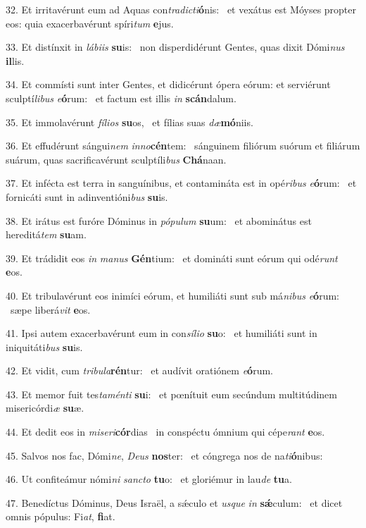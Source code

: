 32. Et irritavérunt eum ad Aquas con\textit{tra}\textit{dic}\textit{ti}\textbf{ó}nis: \ast\  et vexátus est Móyses propter eos: quia exacerbavérunt spíri\textit{tum} \textbf{e}jus.\

33. Et distínxit in \textit{lá}\textit{bi}\textit{is} \textbf{su}is: \ast\  non disperdidérunt Gentes, quas dixit Dómi\textit{nus} \textbf{il}lis.\

34. Et commísti sunt inter Gentes, et didicérunt ópera eórum: et serviérunt sculptí\textit{li}\textit{bus} \textit{e}\textbf{ó}rum: \ast\  et factum est illis \textit{in} \textbf{scán}dalum.\

35. Et immolavérunt \textit{fí}\textit{li}\textit{os} \textbf{su}os, \ast\  et fílias suas \textit{dæ}\textbf{mó}niis.\

36. Et effudérunt sángui\textit{nem} \textit{in}\textit{no}\textbf{cén}tem: \ast\  sánguinem filiórum suórum et filiárum suárum, quas sacrificavérunt sculptíli\textit{bus} \textbf{Chá}naan.\

37. Et infécta est terra in sanguínibus, et contamináta est in opé\textit{ri}\textit{bus} \textit{e}\textbf{ó}rum: \ast\  et fornicáti sunt in adinventióni\textit{bus} \textbf{su}is.\

38. Et irátus est furóre Dóminus in \textit{pó}\textit{pu}\textit{lum} \textbf{su}um: \ast\  et abominátus est hereditá\textit{tem} \textbf{su}am.\

39. Et trádidit eos \textit{in} \textit{ma}\textit{nus} \textbf{Gén}tium: \ast\  et domináti sunt eórum qui odé\textit{runt} \textbf{e}os.\

40. Et tribulavérunt eos inimíci eórum, et humiliáti sunt sub má\textit{ni}\textit{bus} \textit{e}\textbf{ó}rum: \ast\  sæpe liberá\textit{vit} \textbf{e}os.\

41. Ipsi autem exacerbavérunt eum in con\textit{sí}\textit{li}\textit{o} \textbf{su}o: \ast\  et humiliáti sunt in iniquitáti\textit{bus} \textbf{su}is.\

42. Et vidit, cum \textit{tri}\textit{bu}\textit{la}\textbf{rén}tur: \ast\  et audívit oratiónem \textit{e}\textbf{ó}rum.\

43. Et memor fuit tes\textit{ta}\textit{mén}\textit{ti} \textbf{su}i: \ast\  et pœnítuit eum secúndum multitúdinem misericórdi\textit{æ} \textbf{su}æ.\

44. Et dedit eos in \textit{mi}\textit{se}\textit{ri}\textbf{cór}dias \ast\  in conspéctu ómnium qui cépe\textit{rant} \textbf{e}os.\

45. Salvos nos fac, Dómi\textit{ne}, \textit{De}\textit{us} \textbf{nos}ter: \ast\  et cóngrega nos de na\textit{ti}\textbf{ó}nibus:\

46. Ut confiteámur nómi\textit{ni} \textit{sanc}\textit{to} \textbf{tu}o: \ast\  et gloriémur in lau\textit{de} \textbf{tu}a.\

47. Benedíctus Dóminus, Deus Israël, a sǽculo et \textit{us}\textit{que} \textit{in} \textbf{sǽ}culum: \ast\  et dicet omnis pópulus: Fi\textit{at}, \textbf{fi}at.\

